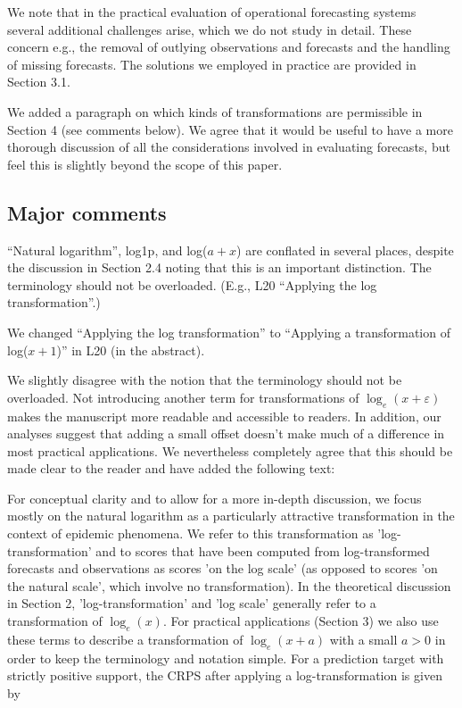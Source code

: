 \documentclass{article}
\newcommand{\black}{\color{black}}
\newcommand{\blue}{\color{blue}}
\newcommand{\indented}{\setlength{\leftskip}{1cm}}
\newcommand{\notindented}{\setlength{\leftskip}{0cm}}
\begin{document}
\indented
We note that in the practical evaluation of operational forecasting systems  several additional challenges arise, which we do not study in detail. These concern e.g., the removal of outlying observations and forecasts and the handling of missing forecasts. The solutions we employed in practice are provided in Section 3.1.
\notindented

We added a paragraph on which kinds of transformations are permissible in Section 4 (see comments below). We agree that it would be useful to have a more thorough discussion of all the considerations involved in evaluating forecasts, but feel this is slightly beyond the scope of this paper. 

\blue
\subsection{Major comments}

``Natural logarithm'', log1p, and log($a + x$) are conflated in several places, despite the discussion in Section 2.4 noting that this is an important distinction. The terminology should not be overloaded. (E.g., L20 ``Applying the log transformation''.)

\black
We changed ``Applying the log transformation'' to ``Applying a transformation of log($x + 1$)'' in L20 (in the abstract). 

We slightly disagree with the notion that the terminology should not be overloaded. Not introducing another term for transformations of $\log_{e}(x + \varepsilon)$ makes the manuscript more readable and accessible to readers. In addition, our analyses suggest that adding a small offset doesn't make much of a difference in most practical applications. We nevertheless completely agree that this should be made clear to the reader and have added the following text: 

\indented
For conceptual clarity and to allow for a more in-depth discussion, we focus mostly on the natural logarithm as a particularly attractive transformation in the context of epidemic phenomena. We refer to this transformation as 'log-transformation' and to scores that have been computed from log-transformed forecasts and observations as scores 'on the log scale' (as opposed to scores 'on the natural scale', which involve no transformation). In the theoretical discussion in Section 2, 'log-transformation' and 'log scale' generally refer to a transformation of $\log_{e}(x)$. For practical applications (Section 3) we also use these terms to describe a transformation of $\log_{e}(x + a)$ with a small $a > 0$ in order to keep the terminology and notation simple. For a prediction target with strictly positive support, the CRPS after applying a log-transformation is given by
\end{document}
